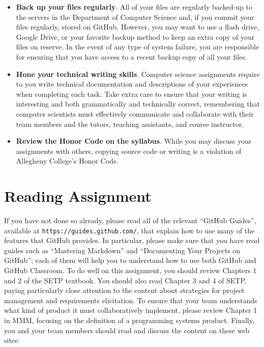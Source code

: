 \documentclass[11pt]{article}
\newcommand{\url}[1]{\lstinline{#1}}
\begin{document}
\begin{itemize}
\item {\bf Back up your files regularly}. All of your files are regularly backed-up to the servers in the Department of
  Computer Science and, if you commit your files regularly, stored on GitHub. However, you may want to use a flash
  drive, Google Drive, or your favorite backup method to keep an extra copy of your files on reserve. In the event of
  any type of system failure, you are responsible for ensuring that you have access to a recent backup copy of all your
  files.

\item {\bf Hone your technical writing skills}. Computer science assignments require to you write technical
  documentation and descriptions of your experiences when completing each task. Take extra care to ensure that your
  writing is interesting and both grammatically and technically correct, remembering that computer scientists must
  effectively communicate and collaborate with their team members and the tutors, teaching assistants, and course
  instructor.

\item {\bf Review the Honor Code on the syllabus}. While you may discuss your assignments with others, copying source
  code or writing is a violation of Allegheny College's Honor Code.

\end{itemize}

\section*{Reading Assignment}

If you have not done so already, please read all of the relevant ``GitHub Guides'', available at
\url{https://guides.github.com/}, that explain how to use many of the features that GitHub provides. In particular,
please make sure that you have read guides such as ``Mastering Markdown'' and ``Documenting Your Projects on GitHub'';
each of them will help you to understand how to use both GitHub and GitHub Classroom. To do well on this assignment, you
should review Chapters 1 and 2 of the SETP textbook. You should also read Chapter 3 and 4 of SETP, paying particularly
close attention to the content about strategies for project management and requirements elicitation. To ensure that your
team understands what kind of product it must collaboratively implement, please review Chapter 1 in MMM, focusing on the
definition of a programming systems product. Finally, you and your team members should read and discuss the content on
these web sites:
\end{document}
